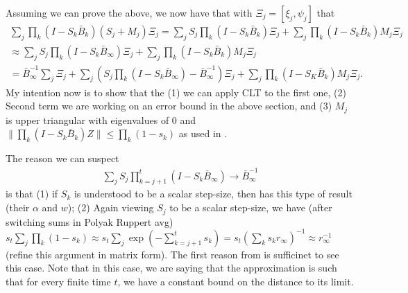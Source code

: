 Assuming we can prove the above, we now have that with $\Xi_j = [\xi_j, \psi_j]$ that
\begin{align*}
    \sum_j \prod_k (I - S_k \bar{B}_k) (S_j + M_j) \Xi_j 
    = \sum_j S_j \prod_k (I - S_k \bar{B}_k) \Xi_j + \sum_j \prod_k (I - S_k \bar{B}_k) M_j \Xi_j 
    \\
    \approx \sum_j S_j \prod_k (I - S_k \bar{B}_\infty) \Xi_j + \sum_j \prod_k (I - S_k \bar{B}_k) M_j \Xi_j 
    \\
    = \bar{B}_\infty^{-1} \sum_j \Xi_j + \sum_j \left(S_j \prod_k (I - S_k \bar{B}_\infty) - \bar{B}_{\infty}^{-1}\right) \Xi_j 
    + \sum_j \prod_k (I - S_K \bar{B}_k) M_j \Xi_j .
\end{align*}
{\color{red}
My intention now is to show that the (1) we can apply CLT to the first one, (2) Second term we are working on an error bound in the above section, and (3) $M_j$ is upper triangular with eigenvalues of 0 and $\lVert \prod_k (I - S_k \bar{B}_k) Z \rVert \leq \prod_k (1 - s_k)$ as used in \citep{konda2004convergence,kaledin2020finite}.
}

The reason we can suspect
\begin{align*}
    \sum_j S_j \prod_{k=j+1}^t (I - S_k \bar{B}_\infty) \to \bar{B}_{\infty}^{-1}
\end{align*}
is that (1) if $S_k$ is understood to be a scalar step-size, then \citep{konda2004convergence} has this type of result (their $\alpha$ and $w$); (2) Again viewing $S_j$ to be a scalar step-size, we have (after switching sums in Polyak Ruppert avg) $s_t \sum_j \prod_k (1 - s_k) \approx s_t \sum_j \exp(-\sum_{k=j+1}^t s_k) = s_t (\sum_k s_k r_\infty)^{-1} \approx r_\infty^{-1}$ (refine this argument in matrix form). 
The first reason from \citep{konda2004convergence} is sufficinet to see this case. 
Note that in this case, we are saying that the approximation is such that for every finite time $t$, we have a constant bound on the distance to its limit.

